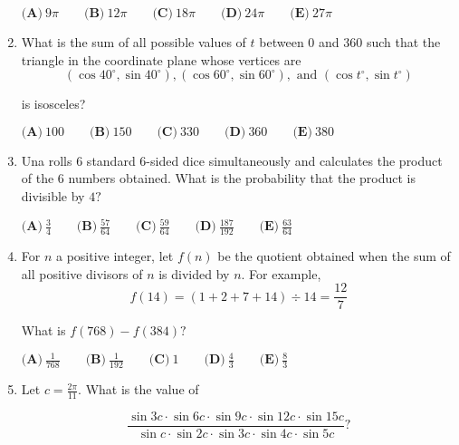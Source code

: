 \documentclass{article}
\begin{document}
\begin{enumerate}[label=\arabic*., itemsep=0.5em]
$\textbf{(A)} \: 9\pi \qquad\textbf{(B)} \: 12\pi \qquad\textbf{(C)} \: 18\pi \qquad\textbf{(D)} \: 24\pi \qquad\textbf{(E)} \: 27\pi$\par \vspace{0.5em}\item What is the sum of all possible values of $t$ between $0$ and $360$ such that the triangle in the coordinate plane whose vertices are 
\begin{equation*}
(\cos 40^\circ,\sin 40^\circ), (\cos 60^\circ,\sin 60^\circ), \text{ and } (\cos t^\circ,\sin t^\circ)
\end{equation*}

is isosceles? 

$\textbf{(A)} \: 100 \qquad\textbf{(B)} \: 150 \qquad\textbf{(C)} \: 330 \qquad\textbf{(D)} \: 360 \qquad\textbf{(E)} \: 380$\par \vspace{0.5em}\item Una rolls $6$ standard $6$-sided dice simultaneously and calculates the product of the $6{ }$ numbers obtained. What is the probability that the product is divisible by $4?$

$\textbf{(A)}\: \frac34\qquad\textbf{(B)} \: \frac{57}{64}\qquad\textbf{(C)} \: \frac{59}{64}\qquad\textbf{(D)} \: \frac{187}{192}\qquad\textbf{(E)} \: \frac{63}{64}$\par \vspace{0.5em}\item For $n$ a positive integer, let $f(n)$ be the quotient obtained when the sum of all positive divisors of $n$ is divided by $n.$ For example, 
\begin{equation*}
f(14)=(1+2+7+14)\div 14=\frac{12}{7}
\end{equation*}

What is $f(768)-f(384)?$

$\textbf{(A)}\ \frac{1}{768} \qquad\textbf{(B)}\ \frac{1}{192} \qquad\textbf{(C)}\ 1 \qquad\textbf{(D)}\
\frac{4}{3} \qquad\textbf{(E)}\ \frac{8}{3}$\par \vspace{0.5em}\item Let $c = \frac{2\pi}{11}.$ What is the value of

\begin{equation*}
\frac{\sin 3c \cdot \sin 6c \cdot \sin 9c \cdot \sin 12c \cdot \sin 15c}{\sin c \cdot \sin 2c \cdot \sin 3c \cdot \sin 4c \cdot \sin 5c}?
\end{equation*}



\end{enumerate}
\end{document}
